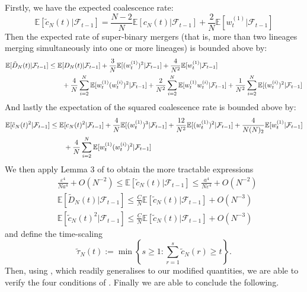 \documentclass[fleqn]{article}
\newcommand{\E}{\mathbb{E}}
\newcommand{\F}{\mathcal{F}_{t-1}}
\newcommand{\wt}[2][t]{w_{#1}^{(#2)}}
\begin{document}
Firstly, we have the expected coalescence rate:
\begin{equation}\label{eq:cNtilde}
\E[\tilde{c}_N(t) |\F] = \frac{N-2}{N} \E[c_N(t) |\F] + \frac{2}{N} \E[\wt{1} |\F]
\end{equation}
Then the expected rate of super-binary mergers (that is, more than two lineages merging simultaneously into one or more lineages) is bounded above by:
\begin{align}\label{eq:DNtilde}
\E[\tilde{D}_N(t) |\F] 
&\leq \E[D_N(t) |\F] + \frac{3}{N} \E[(\wt{1})^2 |\F] +  \frac{4}{N^2}\E[\wt{1} |\F] \notag\\
&\qquad+ \frac{4}{N}\sum_{i=2}^N \E[\wt{1}(\wt{i})^2 |\F] +\frac{2}{N^2}\sum_{i=2}^N \E[\wt{1}\wt{i} |\F] + \frac{1}{N^2} \sum_{i=2}^N \E[(\wt{i})^2 |\F] 
\end{align}
And lastly the expectation of the squared coalescence rate is bounded above by:
\begin{align}\label{eq:cNtilde2}
\E[\tilde{c}_N(t)^2 |\F] 
&\leq \E[c_N(t)^2 |\F] + \frac{4}{N}\E[(\wt{1})^3 |\F] + \frac{12}{N^2} \E[(\wt{1})^2 |\F] + \frac{4}{N(N)_2} \E[\wt{1} |\F] \notag\\
&\qquad + \frac{4}{N} \sum_{i=2}^N \E[\wt{1}(\wt{i})^2 |\F]
\end{align}
We then apply Lemma 3 of \citet{koskela2018} to obtain the more tractable expressions
\begin{align*}
& \frac{\varepsilon^4}{Na^4} + O(N^{-2}) \leq \E[\tilde{c}_N(t) |\F]  \leq \frac{a^4}{N\varepsilon^4} + O(N^{-2}) \\
& \E[\tilde{D}_N(t) |\F] \leq \frac{C}{N} \E[\tilde{c}_N(t) |\F] + O(N^{-3}) \\
& \E[\tilde{c}_N(t)^2 |\F] \leq \frac{C}{N} \E[\tilde{c}_N(t) |\F] + O(N^{-3})
\end{align*}
and define the time-scaling
\begin{equation}\label{eq:tau_tilde}
\tilde{\tau}_N(t) := \min\left\{ s\geq 1 : \sum_{r=1}^s \tilde{c}_N(r) \geq t \right\}.
\end{equation}
Then, using \citet[Lemma 2]{koskela2018}, which readily generalises to our modified quantities, we are able to verify the four conditions of \citet[Theorem 1]{koskela2018}. Finally we are able to conclude the following.
\end{document}
